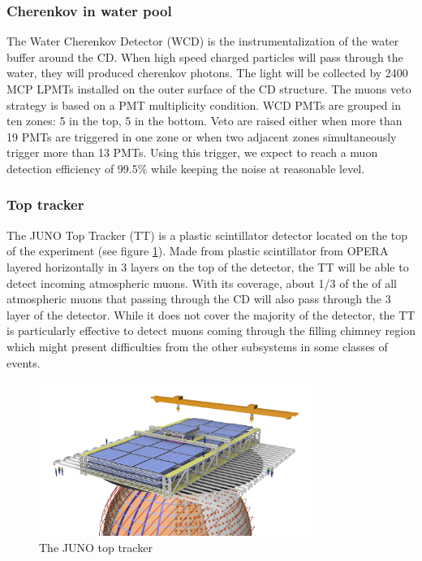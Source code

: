 \subsubsection{Cherenkov in water pool}

The Water Cherenkov Detector (WCD) is the instrumentalization of the water buffer around the CD. When high speed charged particles will pass through the water, they will produced cherenkov photons. The light will be collected by 2400 MCP LPMTs installed on the outer surface of the CD structure. The  muons veto strategy is based on a PMT multiplicity condition. WCD PMTs are grouped in ten zones: 5 in the top, 5 in the bottom. Veto are raised either when more than 19 PMTs are triggered in one zone or when two adjacent zones simultaneously trigger more than 13 PMTs. Using this trigger, we expect to reach a muon detection efficiency of 99.5\% while keeping the noise at reasonable level.

\subsubsection{Top tracker}
The JUNO Top Tracker (TT) is a plastic scintillator detector located on the top of the experiment (see figure \ref{fig:tt}). Made from plastic scintillator from OPERA \cite{acquafredda_opera_2009} layered horizontally in 3 layers on the top of the detector, the TT will be able to detect incoming atmospheric muons.
With its coverage, about 1/3 of the of all atmospheric muons that passing through the CD will also pass through the 3 layer of the detector. While it does not cover the majority of the detector, the TT is particularly effective to detect muons coming through the filling chimney region which might present difficulties from the other subsystems in some classes of events.
\begin{figure}[ht]
  \centering
  \includegraphics[height=5cm]{images/juno/Global_TT_01.png}
  \caption{The JUNO top tracker}
  \label{fig:tt}
\end{figure}

